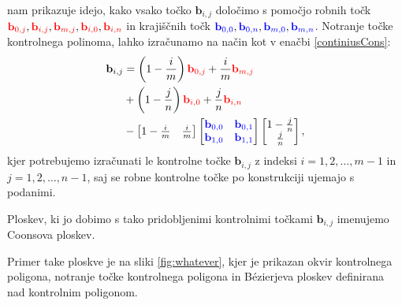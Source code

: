 \documentclass[a4paper,12pt]{article}
\begin{document}
nam prikazuje idejo, kako vsako točko $\mathbf{b}_{i,j}$ določimo s pomočjo 
robnih točk $\color{red} \mathbf{b}_{0,j} \color{black}, \color{red} \mathbf{b}_{i,j} \color{black}, \color{red} \mathbf{b}_{m,j} 
\color{black}, \color{red} \mathbf{b}_{i,0}\color{black} \color{black}, \color{red} \mathbf{b}_{i,n}$ in krajiščnih točk 
$\color{blue} \mathbf{b}_{0,0} \color{black}, \color{blue} \mathbf{b}_{0,n}\color{black}, \color{blue} \mathbf{b}_{m,0}\color{black}, \color{blue} \mathbf{b}_{m,n}$. 
 Notranje točke kontrolnega polinoma, lahko izračunamo na način kot v 
 enačbi \eqref{continiusCons}: 
 \begin{align}
   \label{diskertni}
   \mathbf{b}_{i,j} &= \left(1 - \frac{i}{m}\right) \color{red} \mathbf{b}_{0,j} \color{black}+\frac{i}{m}\color{red}\mathbf{b}_{m,j} \notag \\
    &+ \left(1 - \frac{j}{n}\right)\color{red}\mathbf{b}_{i,0} \color{black}+\frac{j}{n} \color{red}\mathbf{b}_{i,n}\ \\
   &- 
   \begin{bmatrix} 
      1 - \frac{i}{m} & \frac{i}{m}
   \end{bmatrix}
   \begin{bmatrix} 
       \color{blue} \mathbf{b}_{0,0} &  \color{blue} \mathbf{b}_{0,1} \notag\\
       \color{blue} \mathbf{b}_{1,0} &  \color{blue} \mathbf{b}_{1,1}
   \end{bmatrix}
   \begin{bmatrix}
      1 - \frac{j}{n}\\
      \frac{j}{n}
   \end{bmatrix},
\end{align}
kjer potrebujemo izračunati le kontrolne točke 
$\mathbf{b}_{i,j}$ z indeksi $i = 1,2,\dots,m-1$ in $j = 1,2,\dots,n-1$, 
saj se robne kontrolne točke po konstrukciji ujemajo s podanimi.

\begin{definicija}
Ploskev, ki jo dobimo s tako pridobljenimi kontrolnimi točkami $\mathbf{b}_{i,j}$
imenujemo Coonsova ploskev.
\end{definicija}

Primer take ploskve je na sliki \ref{fig:whatever}, kjer je prikazan 
okvir kontrolnega poligona, notranje točke kontrolnega poligona in 
Bézierjeva ploskev definirana nad kontrolnim poligonom.
\end{document}
